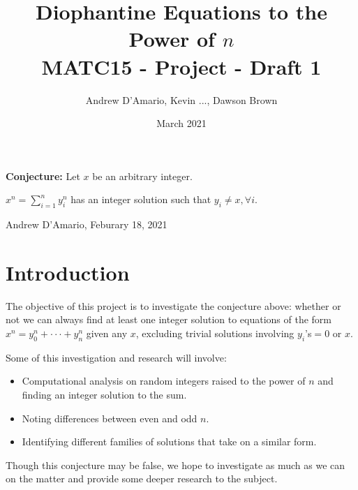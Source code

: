 \documentclass{article}
\title{Diophantine Equations to the Power of $n$ \\ \vspace{.3in} \large{MATC15 - Project - Draft 1}}
\author{Andrew D'Amario, Kevin ..., Dawson Brown }
\date{March 2021}
\begin{document}
\maketitle

\begin{flushleft}
    {\bf Conjecture:} Let $x$ be an arbitrary integer.

    \hspace{.5in}$\displaystyle x^n=\sum^{n}_{i=1}y_i^n$ has an integer solution such that $y_i\ne x, \forall i$.

    \hspace{2in} Andrew D'Amario, Feburary 18, 2021
\end{flushleft}

\section{Introduction}
The objective of this project is to investigate the conjecture above: whether or not we can always find at least one integer solution to equations of the form $x^n=y_0^n+\cdot\cdot\cdot+y_n^n$ given any $x$, excluding trivial solutions involving $y_i$'s$=0$ or $x$. 

Some of this investigation and research will involve:
\begin{itemize}
    \item Computational analysis on random integers raised to the power of $n$ and finding an integer solution to the sum.
    \item Noting differences between even and odd $n$.
    \item Identifying different families of solutions that take on a similar form.
\end{itemize}

Though this conjecture may be false, we hope to investigate as much as we can on the matter and provide some deeper research to the subject.



\end{document}
